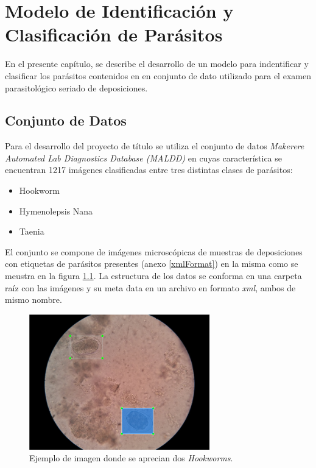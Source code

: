\documentclass[letter,12pt]{report}
\begin{document}
\chapter{Modelo de Identificación y Clasificación de Parásitos}\label{clasificación}

En el presente capítulo, se describe el desarrollo de un modelo para indentificar y
clasificar los parásitos contenidos en en conjunto de dato utilizado para el examen 
parasitológico seriado de deposiciones.

\section{Conjunto de Datos}
Para el desarrollo del proyecto de título se utiliza el conjunto de datos
\textit{Makerere Automated Lab Diagnostics Database (MALDD)} en cuyas
característica se encuentran 1217 imágenes clasificadas entre tres distintas
clases de parásitos:

\begin{itemize}
    \item Hookworm
    \item Hymenolepsis Nana
    \item Taenia
\end{itemize}

El conjunto se compone de imágenes microscópicas de muestras de deposiciones con etiquetas
de parásitos presentes (anexo \ref{xmlFormat}) en la misma como se meustra en la figura
\ref{fig:labelImage}. La estructura de los datos se conforma en una carpeta raíz con las
imágenes y su meta data en un archivo en formato \textit{xml}, ambos de mismo nombre.

\begin{figure}[ht]
    \centering
    \includegraphics[width=0.7\textwidth]{labelImage}
    \caption{Ejemplo de imagen donde se aprecian dos \textit{Hookworms}.}
    \label{fig:labelImage}
\end{figure}
\end{document}
